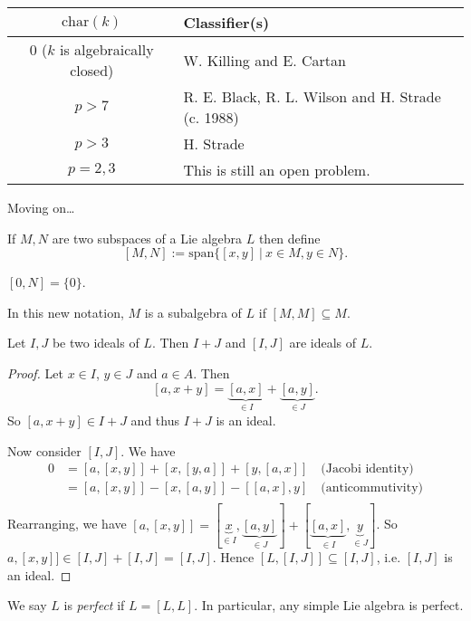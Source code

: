 \begin{center}
	\begin{tabular}{c|l}
		$\text{char}(k)$ & Classifier(s) \\
		\hline
		$0$ ($k$ is algebraically closed) & W. Killing and E. Cartan \\
		$p > 7$ & R. E. Black, R. L. Wilson and H. Strade (c. 1988) \\
		$p > 3$ & H. Strade \\
		$p = 2, 3$ & This is still an open problem.
	\end{tabular}
\end{center}

Moving on\ldots

\begin{definition}
	If $M, N$ are two subspaces of a Lie algebra $L$ then define
	\[
		[M, N] := \text{span}\{[x, y]\ |\ x \in M, y \in N\}.
	\]
\end{definition}

\begin{example}
	$[0, N] = \{0\}$.
\end{example}

In this new notation, $M$ is a subalgebra of $L$ if $[M, M] \subseteq M$.

\begin{lemma}
	Let $I, J$ be two ideals of $L$. Then $I + J$ and $[I, J]$ are ideals of $L$.
	\begin{proof}
		Let $x \in I$, $y \in J$ and $a \in A$. Then
		\[
			[a, x + y] = \underbrace{[a, x]}_{\in I} + \underbrace{[a, y]}_{\in J}.
		\]
		So $[a, x + y] \in I + J$ and thus $I + J$ is an ideal.
		
		Now consider $[I, J]$. We have
		\begin{align*}
			0 &= [a, [x, y]] + [x, [y, a]] + [y, [a, x]] \quad \text{(Jacobi identity)} \\
			  &= [a, [x, y]] - [x, [a, y]] - [[a, x], y] \quad \text{(anticommutivity)} \\
		\end{align*}
		Rearranging, we have $[a, [x, y]] = [\underbrace{x}_{\in I}, \underbrace{[a, y]}_{\in J}] + [\underbrace{[a, x]}_{\in I}, \underbrace{y}_{\in J}]$.
		So $a, [x, y]] \in [I, J] + [I, J] = [I, J]$. Hence $[L, [I, J]] \subseteq [I, J]$, i.e. $[I, J]$ is an ideal.
	\end{proof}
\end{lemma}

\begin{definition}
	We say $L$ is \emph{perfect} if $L = [L, L]$. In particular, any simple Lie algebra is perfect.
\end{definition}

